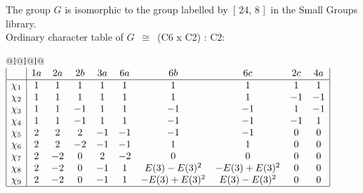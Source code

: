 \documentclass[varwidth=\maxdimen,border=10]{standalone}
\begin{document}
The group $G$ is isomorphic to the group labelled by\ [ 24, 8 ]\ in the Small Groups library.\\
Ordinary character table of $G$\ $\cong$\ (C6 x C2) : C2:\\
\begin{center}
\begin{tabular}{@{}l@{}l@{}l@{}}
\hline
\(\begin{array}{|l|ccccccccc|}
  & 1a & 2a & 2b & 3a & 6a & 6b & 6c & 2c & 4a\\ \hline
\chi_{1} & 1 & 1 & 1 & 1 & 1 & 1 & 1 & 1 & 1\\
\chi_{2} & 1 & 1 & 1 & 1 & 1 & 1 & 1 & -1 & -1\\
\chi_{3} & 1 & 1 & -1 & 1 & 1 & -1 & -1 & 1 & -1\\
\chi_{4} & 1 & 1 & -1 & 1 & 1 & -1 & -1 & -1 & 1\\
\chi_{5} & 2 & 2 & 2 & -1 & -1 & -1 & -1 & 0 & 0\\
\chi_{6} & 2 & 2 & -2 & -1 & -1 & 1 & 1 & 0 & 0\\
\chi_{7} & 2 & -2 & 0 & 2 & -2 & 0 & 0 & 0 & 0\\
\chi_{8} & 2 & -2 & 0 & -1 & 1 & E(3)-E(3)^{2} & -E(3)+E(3)^{2} & 0 & 0\\
\chi_{9} & 2 & -2 & 0 & -1 & 1 & -E(3)+E(3)^{2} & E(3)-E(3)^{2} & 0 & 0\\
\hline
\end{array}\)\\
\end{tabular}
\end{center}
\end{document}
